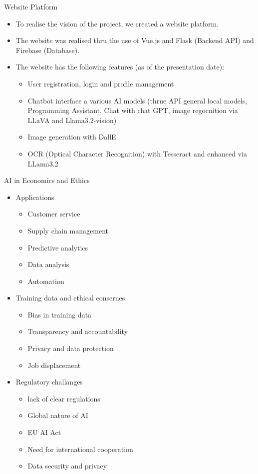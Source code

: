 \documentclass{beamer}
\begin{document}
\begin{frame}{Website Platform}
  \begin{itemize}
    \item To realise the vision of the project, we created a website platform. 
    \item The website was realised thru the use of Vue.js and Flask (Backend API) and Firebase (Database).
    \item The website has the following features (as of the presentation date):
    \begin{itemize}
      \item User registration, login and profile management
      \item Chatbot interface a various AI models (thrue API general local models, Programming Assistant, Chat with chat GPT, image regocnition via LLaVA and Llama3.2-vision)
      \item Image generation with DallE
      \item OCR (Optical Character Recognition) with Tesseract and enhanced via LLama3.2
    \end{itemize}
    \end{itemize}
\end{frame}

\begin{frame}{AI in Economics and Ethics}
  \begin{itemize}
    \item Applications
    \begin{itemize}
      \item Customer service
      \item Supply chain management
      \item Predictive analytics
      \item Data analysis
      \item Automation
    \end{itemize}
    \item Training data and ethical consernes
    \begin{itemize}
      \item Bias in training data
      \item Transparency and accountability
      \item Privacy and data protection
      \item Job displacement
    \end{itemize}
    \item Regulatory challanges
    \begin{itemize}
      \item lack of clear regulations
      \item Global nature of AI 
      \item EU AI Act
      \item Need for international cooperation
      \item Data security and privacy
    \end{itemize}
  \end{itemize}
\end{frame}
\end{document}

